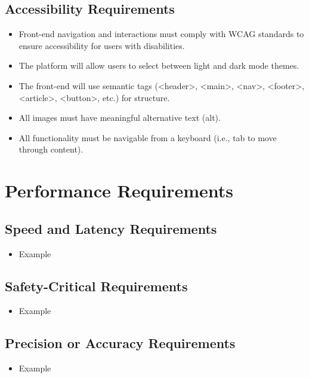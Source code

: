 \documentclass[12pt]{article}
\begin{document}
  \subsection{Accessibility Requirements}
    \begin{itemize}
      \item Front-end navigation and interactions must comply with WCAG standards to ensure accessibility for users with disabilities.
      \item The platform will allow users to select between light and dark mode themes.
      \item The front-end will use semantic tags (<header>, <main>, <nav>, <footer>, <article>, <button>, etc.) for structure.
      \item All images must have meaningful alternative text (alt).
      \item All functionality must be navigable from a keyboard (i.e., tab to move through content).
    \end{itemize}

\section{Performance Requirements}
  \subsection{Speed and Latency Requirements}
    \begin{itemize}
      \item Example
    \end{itemize}

  \subsection{Safety-Critical Requirements}
    \begin{itemize}
      \item Example
    \end{itemize}

  \subsection{Precision or Accuracy Requirements}
    \begin{itemize}
      \item Example
    \end{itemize}
\end{document}
